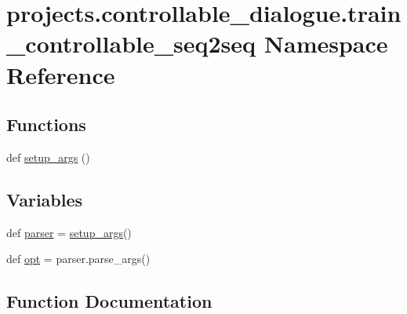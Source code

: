 \hypertarget{namespaceprojects_1_1controllable__dialogue_1_1train__controllable__seq2seq}{}\section{projects.\+controllable\+\_\+dialogue.\+train\+\_\+controllable\+\_\+seq2seq Namespace Reference}
\label{namespaceprojects_1_1controllable__dialogue_1_1train__controllable__seq2seq}
\subsection*{Functions}
\begin{DoxyCompactItemize}
\item 
def \hyperlink{namespaceprojects_1_1controllable__dialogue_1_1train__controllable__seq2seq_a493d97108e1bc85e7dee02310e5303ad}{setup\+\_\+args} ()
\end{DoxyCompactItemize}
\subsection*{Variables}
\begin{DoxyCompactItemize}
\item 
def \hyperlink{namespaceprojects_1_1controllable__dialogue_1_1train__controllable__seq2seq_a53cabbc4f776dfee1e3dbd85bd6f9dbf}{parser} = \hyperlink{namespaceprojects_1_1controllable__dialogue_1_1train__controllable__seq2seq_a493d97108e1bc85e7dee02310e5303ad}{setup\+\_\+args}()
\item 
def \hyperlink{namespaceprojects_1_1controllable__dialogue_1_1train__controllable__seq2seq_a4c72407bb11bb3a748b7781dace7b983}{opt} = parser.\+parse\+\_\+args()
\end{DoxyCompactItemize}


\subsection{Function Documentation}
\mbox{\label{namespaceprojects_1_1controllable__dialogue_1_1train__controllable__seq2seq_a493d97108e1bc85e7dee02310e5303ad}} 
